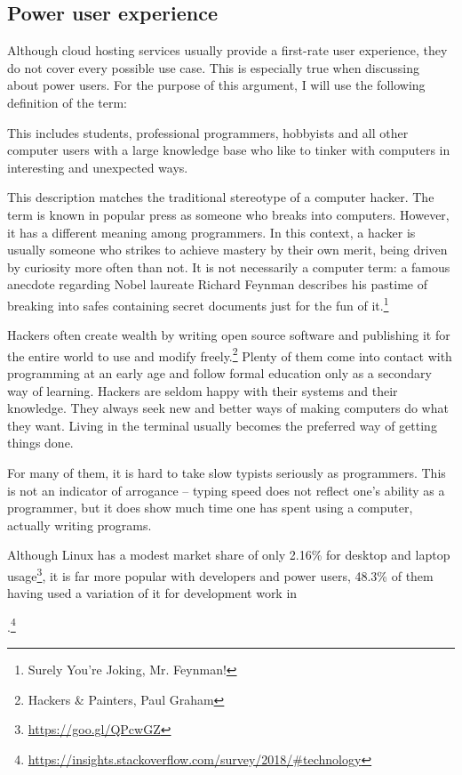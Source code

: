 \subsection{Power user experience} \label{power_user_experience}

Although cloud hosting services usually provide a first-rate user experience, they do not cover every possible use case. This is especially true when discussing about power users. For the purpose of this argument, I will use the following definition of the term:


This includes students, professional programmers, hobbyists and all other computer users with a large knowledge base who like to tinker with computers in interesting and unexpected ways.

This description matches the traditional stereotype of a computer hacker. The term is known in popular press as someone who breaks into computers. However, it has a different meaning among programmers. In this context, a hacker is usually someone who strikes to achieve mastery by their own merit, being driven by curiosity more often than not. It is not necessarily a computer term: a famous anecdote regarding Nobel laureate Richard Feynman describes his pastime of breaking into safes containing secret documents just for the fun of it.\footnote{Surely You're Joking, Mr. Feynman!}

Hackers often create wealth by writing open source software and publishing it for the entire world to use and modify freely.\footnote{Hackers \& Painters, Paul Graham} Plenty of them come into contact with programming at an early age and follow formal education only as a secondary way of learning. Hackers are seldom happy with their systems and their knowledge. They always seek new and better ways of making computers do what they want. Living in the terminal usually becomes the preferred way of getting things done.

For many of them, it is hard to take slow typists seriously as programmers. This is not an indicator of arrogance -- typing speed does not reflect one's ability as a programmer, but it does show much time one has spent using a computer, actually writing programs.

Although Linux has a modest market share of only 2.16\% for desktop and laptop usage\footnote{\url{https://goo.gl/QPcwGZ}}, it is far more popular with developers and power users, 48.3\% of them having used a variation of it for development work in \date{2018}.\footnote{\url{https://insights.stackoverflow.com/survey/2018/#technology}}

